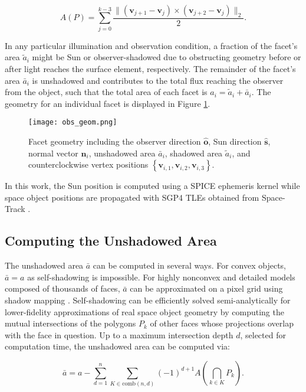 \documentclass[a4paper,twocolumn]{spaceDebrisC} %
\newcommand{\vctr}[1]{\bm{#1}}
\newcommand{\unitv}[1]{\hat{\vctr{#1}}}
\newcommand{\figmed}[0]{0.4\textwidth}
\begin{document}
\begin{equation} \label{eq:poly_area}
 A(P) = \sum_{j=0}^{k-3} \frac{\| \left( \vctr{v}_{j+1} - \vctr{v}_{j} \right) \times \left( \vctr{v}_{j+2} - \vctr{v}_{j} \right)\|_2}{2}.
 \end{equation} 
 
 In any particular illumination and observation condition, a fraction of the facet's area $\tilde{a}_i$ might be Sun or observer-shadowed due to obstructing geometry before or after light reaches the surface element, respectively. The remainder of the facet's area $\bar{a}_i$ is unshadowed and contributes to the total flux reaching the observer from the object, such that the total area of each facet is $a_i = \tilde{a}_i + \bar{a}_i$. The geometry for an individual facet is displayed in Figure \ref{fig:facet_geom}.

\begin{figure}[H]
  \centering
  \texttt{[image: obs\_geom.png]}
  \caption{Facet geometry including the observer direction $\unitv{o}$, Sun direction $\unitv{s}$, normal vector $\unitv{n}_i$, unshadowed area $\bar{a}_i$, shadowed area $\tilde{a}_i$, and counterclockwise vertex positions $\left\{ \vctr{v}_{i,1}, \vctr{v}_{i,2}, \vctr{v}_{i,3} \right\}$.}
  \label{fig:facet_geom}
\end{figure}

In this work, the Sun position is computed using a SPICE ephemeris kernel \cite{spice} while space object positions are propagated with SGP4 TLEs obtained from Space-Track \cite{spacetrack}.

\subsection{Computing the Unshadowed Area}

The unshadowed area $\bar{a}$ can be computed in several ways. For convex objects, $\bar{a}=a$ as self-shadowing is impossible. For highly nonconvex and detailed models composed of thousands of faces, $\bar{a}$ can be approximated on a pixel grid using shadow mapping \cite{robinson2022}. Self-shadowing can be efficiently solved semi-analytically for lower-fidelity approximations of real space object geometry by computing the mutual intersections of the polygons $P_k$ of other faces whose projections overlap with the face in question. Up to a maximum intersection depth $d$, selected for computation time, the unshadowed area can be computed via:

\begin{equation} \label{eq:us_area}
 \bar{a} = a - \sum_{d=1}^{n} \sum_{K \in \text{comb}(n,d)} (-1)^{d+1} A\left(\bigcap\limits_{k \in K} P_k\right).
\end{equation}
\end{document}
